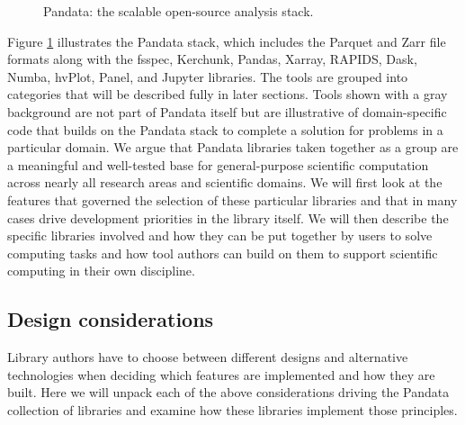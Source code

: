 \begin{figure}[t]
    \noindent{}
    \caption{Pandata: the scalable open-source analysis stack\label{pandata}.}
\end{figure}
Figure \ref{pandata} illustrates the Pandata stack, which includes the Parquet and Zarr file formats along with the fsspec, Kerchunk, Pandas, Xarray, RAPIDS, Dask, Numba, hvPlot, Panel, and Jupyter libraries. The tools are grouped into categories that will be described fully in later sections. Tools shown with a gray background are not part of Pandata itself but are illustrative of domain-specific code that builds on the Pandata stack to complete a solution for problems in a particular domain. We argue that Pandata libraries taken together as a group are a meaningful and well-tested base for general-purpose scientific computation across nearly all research areas and scientific domains. We will first look at the features that governed the selection of these particular libraries and that in many cases drive development priorities in the library itself. We will then describe the specific libraries involved and how they can be put together by users to solve computing tasks and how tool authors can build on them to support scientific computing in their own discipline.

\subsection{Design considerations}

Library authors have to choose between different designs and alternative technologies when deciding which features are implemented and how they are built.  Here we will unpack each of the above considerations driving the Pandata collection of libraries and examine how these libraries implement those principles.

